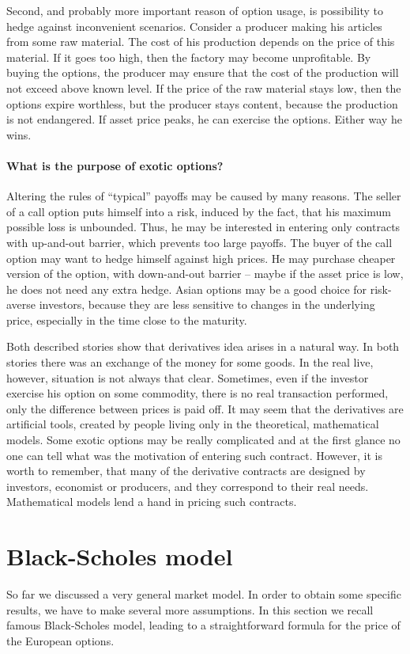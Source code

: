 \documentclass[a4paper,11pt, twoside]{book}
\theoremstyle{definition}
\theoremstyle{remark}
\begin{document}
Second, and probably more important reason of option usage, is possibility to hedge against inconvenient scenarios. Consider a producer making his articles from some raw material. The cost of his production depends on the price of this material. If it goes too high, then the factory may become unprofitable. By buying the options, the producer may ensure that the cost of the production will not exceed above known level. If the price of the raw material stays low, then the options expire worthless, but the producer stays content, because the production is not endangered. If asset price peaks, he can exercise the options. Either way he wins.


\paragraph{What is the purpose of exotic options?}
Altering the rules of ``typical'' payoffs may be caused by many reasons. The seller of a call option puts himself into a risk, induced by the fact, that his maximum possible loss is unbounded. Thus, he may be interested in entering only contracts with up-and-out barrier, which prevents too large payoffs. The buyer of the call option may want to hedge himself against high prices.
He may purchase cheaper version of the option, with down-and-out  barrier -- maybe if the asset price is low, he does not need any extra hedge. Asian options may be a good choice for risk-averse investors, because they are less sensitive to changes in the underlying price, especially in the time close to the maturity.

Both described stories show that derivatives idea arises in a natural way. In both stories there was an exchange of the money for some goods. In the real live, however, situation is not always that clear. Sometimes, even if the investor exercise his option on some commodity, there is no real transaction performed, only the difference between prices is paid off.
It may seem that the derivatives are artificial tools, created by people living only in the theoretical, mathematical models. Some exotic options may be really complicated and at the first glance no one can tell what was the motivation of entering such contract. However, it is worth to remember, that many of the derivative contracts are designed by investors, economist or producers, and they correspond to their real needs. Mathematical models lend a hand in pricing such contracts.


\section{Black-Scholes model}
\label{sec:blackScholes}
So far we discussed a very general market model. In order to obtain some specific results, we have to make several more assumptions.
In this section we recall famous Black-Scholes model, leading to a straightforward formula for the price of the European options.
\end{document}
